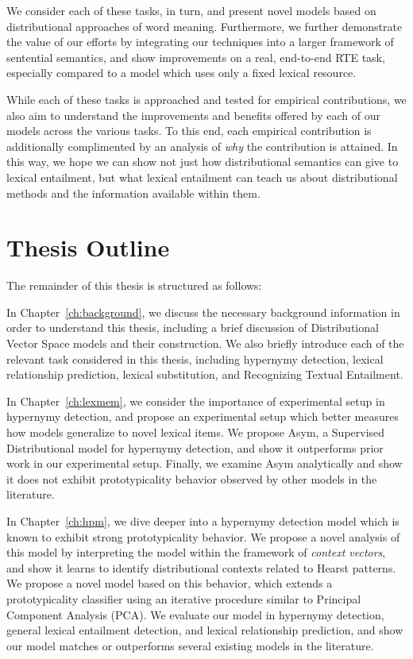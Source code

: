 We consider each of these tasks, in turn, and present novel models based on
distributional approaches of word meaning. Furthermore, we further demonstrate
the value of our efforts by integrating our techniques into a larger framework
of sentential semantics, and show improvements on a real, end-to-end RTE task,
especially compared to a model which uses only a fixed lexical resource.

While each of these tasks is approached and tested for empirical contributions,
we also aim to understand the improvements and benefits offered by each of our
models across the various tasks. To this end, each empirical contribution is
additionally complimented by an analysis of {\em why} the contribution is
attained. In this way, we hope we can show not just how distributional
semantics can give to lexical entailment, but what lexical entailment can teach
us about distributional methods and the information available within them.



\section{Thesis Outline}

The remainder of this thesis is structured as follows:

In Chapter~\ref{ch:background}, we discuss the necessary background
information in order to understand this thesis, including a brief discussion
of Distributional Vector Space models and their construction. We also
briefly introduce each of the relevant task considered in this thesis,
including hypernymy detection, lexical relationship prediction, lexical
substitution, and Recognizing Textual Entailment.

In Chapter~\ref{ch:lexmem}, we consider the importance of experimental setup in
hypernymy detection, and propose an experimental setup which better measures
how models generalize to novel lexical items. We propose Asym, a Supervised
Distributional model for hypernymy detection, and show it outperforms prior
work in our experimental setup. Finally, we examine Asym analytically and show
it does not exhibit prototypicality behavior observed by other models in
the literature.

In Chapter~\ref{ch:hpm}, we dive deeper into a hypernymy detection model which
is known to exhibit strong prototypicality behavior. We propose a novel
analysis of this model by interpreting the model within the framework of
{\em context vectors}, and show it learns to identify distributional contexts
related to Hearst patterns. We propose a novel model based on this behavior,
which extends a prototypicality classifier using an iterative procedure
similar to Principal Component Analysis (PCA). We evaluate our model in
hypernymy detection, general lexical entailment detection, and lexical
relationship prediction, and show our model matches or outperforms several
existing models in the literature.


